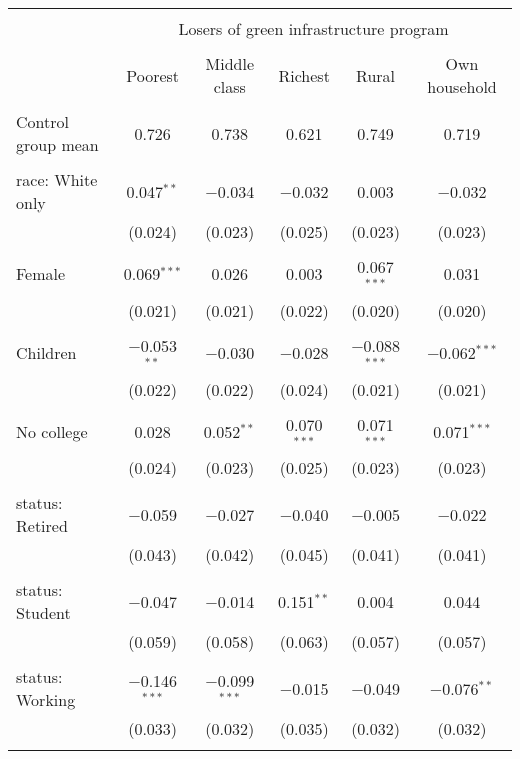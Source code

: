 
\begin{tabular}{@{\extracolsep{5pt}}lccccc} 
\\[-1.8ex]\hline 
\hline \\[-1.8ex] 
 & \multicolumn{5}{c}{Losers of green infrastructure program} \\ 
\cline{2-6} 
\\[-1.8ex] & Poorest & Middle class & Richest & Rural & Own household \\ 
\hline \\[-1.8ex] 
 Control group mean & 0.726 & 0.738 & 0.621 & 0.749 & 0.719  \\ \hline \\[-1.8ex] race: White only & 0.047$^{**}$ & $-$0.034 & $-$0.032 & 0.003 & $-$0.032 \\ 
  & (0.024) & (0.023) & (0.025) & (0.023) & (0.023) \\ 
  & & & & & \\ 
 Female & 0.069$^{***}$ & 0.026 & 0.003 & 0.067$^{***}$ & 0.031 \\ 
  & (0.021) & (0.021) & (0.022) & (0.020) & (0.020) \\ 
  & & & & & \\ 
 Children & $-$0.053$^{**}$ & $-$0.030 & $-$0.028 & $-$0.088$^{***}$ & $-$0.062$^{***}$ \\ 
  & (0.022) & (0.022) & (0.024) & (0.021) & (0.021) \\ 
  & & & & & \\ 
 No college & 0.028 & 0.052$^{**}$ & 0.070$^{***}$ & 0.071$^{***}$ & 0.071$^{***}$ \\ 
  & (0.024) & (0.023) & (0.025) & (0.023) & (0.023) \\ 
  & & & & & \\ 
 status: Retired & $-$0.059 & $-$0.027 & $-$0.040 & $-$0.005 & $-$0.022 \\ 
  & (0.043) & (0.042) & (0.045) & (0.041) & (0.041) \\ 
  & & & & & \\ 
 status: Student & $-$0.047 & $-$0.014 & 0.151$^{**}$ & 0.004 & 0.044 \\ 
  & (0.059) & (0.058) & (0.063) & (0.057) & (0.057) \\ 
  & & & & & \\ 
 status: Working & $-$0.146$^{***}$ & $-$0.099$^{***}$ & $-$0.015 & $-$0.049 & $-$0.076$^{**}$ \\ 
  & (0.033) & (0.032) & (0.035) & (0.032) & (0.032) \\ 
  & & & & & \\ 

\end{tabular}
